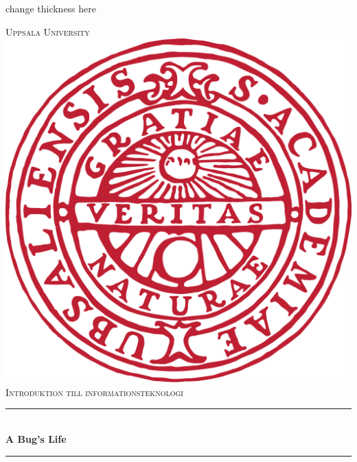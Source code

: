 \documentclass[12pt]{article}
\begin{document}
\begin{titlepage}

\newcommand{\HRule}{\rule{\linewidth}{0.5mm}} %
change thickness here

\center%

\center%
 

\textsc{\LARGE Uppsala University}\\[1.5cm] %
\includegraphics[scale=.1]{Uppsala_University_seal_svg.png}\\[1cm] %
\textsc{\Large Introduktion till informationsteknologi}\\[0.5cm] %

\HRule\\[0.4cm]
{ \huge \bfseries A Bug's Life}\\[0.4cm] %
\HRule\\[1.5cm]
 

\end{titlepage}
\end{document}
